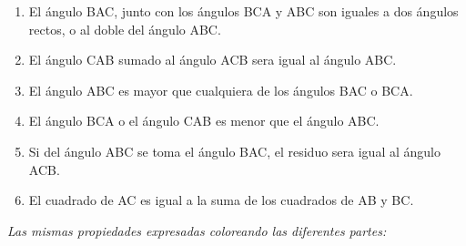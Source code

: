 \documentclass[booklanguage=english]{byrnebook}
\begin{document}
\baselineskip

\begin{enumerate}
\item El ángulo BAC, junto con los ángulos BCA y ABC son iguales a dos ángulos rectos, o al doble del ángulo ABC.
\item El ángulo CAB sumado al ángulo ACB sera igual al ángulo ABC.
\item El ángulo ABC es mayor que cualquiera de los ángulos BAC o BCA.
\item El ángulo BCA o el ángulo CAB es menor que el ángulo ABC.
\item Si del ángulo ABC se toma el ángulo BAC, el residuo sera igual al ángulo ACB.
\item El cuadrado de AC es igual a la suma de los cuadrados de AB y BC.
\end{enumerate}

\baselineskip

\pagebreak

\begin{center}
\emph{Las mismas propiedades expresadas coloreando las diferentes partes:}
\end{center}

\baselineskip
\end{document}
